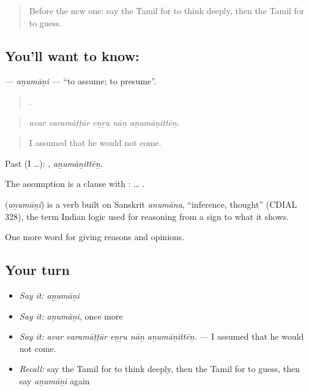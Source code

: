 \label{lesson:TA-C349-anumani}



\begin{quote}
Before the new one: say the Tamil for to think deeply, then the Tamil for to guess.
\end{quote}

\subsection*{You'll want to know: }
\textbf{} — \emph{aṉumāṉi} — \textquotedblleft{}to assume; to presume\textquotedblright{}.

\begin{quote}
    .
\end{quote}

\begin{quote}
\emph{avar varamāṭṭār eṉṟu nāṉ aṉumāṉittēṉ.}
\end{quote}

\begin{quote}
I assumed that he would not come.
\end{quote}

Past (I …): , \emph{aṉumāṉittēṉ}.

The assumption is a clause with : …  .

\begin{cousinweb}
\textbf{} (\emph{aṉumāṉi}) is a verb built on Sanskrit \emph{anumāna}, \textquotedblleft{}inference, thought\textquotedblright{} (CDIAL 328), the term Indian logic used for reasoning from a sign to what it shows.
\end{cousinweb}

\begin{grammarlens}[title={What you've built}]
One more word for giving reasons and opinions.
\end{grammarlens}

\subsection*{Your turn}
\begin{itemize}
\raggedright
  \item \emph{Say it:} \emph{aṉumāṉi}
  \item \emph{Say it:} \emph{aṉumāṉi}, once more
  \item \emph{Say it:} \emph{avar varamāṭṭār eṉṟu nāṉ aṉumāṉittēṉ.} — I assumed that he would not come.
  \item \emph{Recall:} say the Tamil for to think deeply, then the Tamil for to guess, then say \emph{aṉumāṉi} again
\end{itemize}

